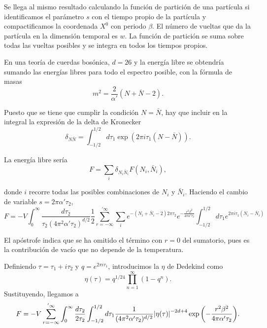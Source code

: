 Se llega al mismo resultado calculando la función de partición de una partícula  si identificamos 
el parámetro $s$ con el tiempo propio  de la partícula y compactificamos 
la coordenada $X^0$ con periodo $\beta$. El número de vueltas que da la
partícula en la dimensión temporal es $w$. La función de partición se suma sobre
todas las vueltas posibles y se integra en todos los tiempos propios.

En una teoría de cuerdas bosónica, $d=26$ y la energía libre se obtendría sumando las
energías libres para todo el espectro posible, con la fórmula de masas
\begin{equation}
  m^2=\frac{2}{\alpha'}(N+\bar N-2).
\end{equation}

Puesto que se tiene que cumplir la condición $N=\bar N$, hay que incluir en la 
integral la expresión de la delta de Kronecker
\begin{equation}
   \delta_{N\bar N}=\int_{-1/2}^{1/2}d\tau_1 \exp(2\pi i\tau_1 (N-\bar N)).
\end{equation}

La energía libre sería
\begin{equation}
  F=\sum_i \delta_{N_i \bar N_i} F(N_i,\bar N_i),
\end{equation}

donde $i$ recorre todas las posibles combinaciones de $N_i$ y $\bar N_i$.
Haciendo el cambio de variable $s=2\pi\alpha'\tau_2$,
\begin{equation}
  F=-V \int_0^\infty \frac{d\tau_2}{\tau_2(4\pi^2\alpha'\tau_2)^{d/2}}\frac 1 2\sum_{r=-\infty}^{'\infty} 
  \sum_i e^{-(N_i+\bar N_i -2)2\pi\tau_2} e^{-\frac{r^2\beta^2}{4\pi\alpha'\tau_2}}\int_{-1/2}^{1/2} d\tau_1 e^{2\pi i\tau_1(N_i-\bar N_i)}
\end{equation}

El apóstrofe indica que se ha omitido el término con $r=0$ del sumatorio, pues es la contribución
de vacío que no depende de la temperatura.

Definiendo $\tau=\tau_1+i\tau_2$ y $q=e^{2\pi i\tau_1}$, introducimos la $\eta$ de 
Dedekind como
\begin{equation}
  \eta(\tau)=q^{1/24}\prod_{n=1}^{\infty} (1-q^n).
\end{equation}
Sustituyendo, llegamos a 
\begin{equation}
  F=-V \sum_{r=-\infty}^{'\infty} \int_0^\infty\frac{d\tau_2}{2\tau_2} \int_{-1/2}^{1/2} d\tau_1  \frac{1}{(4\pi^2\alpha'\tau_2)^{d/2}}
  \abs{\eta(\tau)}^{-2d+4}\exp\qty(-\frac{r^2\beta^2}{4\pi\alpha'\tau_2}).
  \label{eq:strip}
\end{equation}

